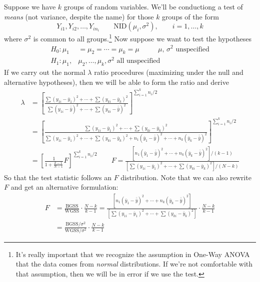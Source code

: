 \documentclass[a4paper,12pt]{scrartcl}
\begin{document}
Suppose we have $k$ groups of random variables. We'll be
conductiong a test of
\emph{means} (not variance, despite the name) for those $k$ groups
of the form
\[ Y_{i1}, Y_{i2}, \ldots, Y_{in_i} \qquad \text{NID}(\mu_i, \sigma^2),
      \qquad i=1, \ldots, k \]
where $\sigma^2$ is common to all groups.\footnote{It's really important
that we recognize the assumption in One-Way ANOVA that the data comes
from \emph{normal} distributions. If we're not comfortable with that
assumption, then we will be in error if we
use the test.} Now suppose we want to test
the hypotheses
\begin{align*}
   H_0: \mu_1& = \mu_2 = \cdots = \mu_k = \mu \qquad
      \text{ $\mu$, $\sigma^2$ unspecified} \\
   H_1: \mu_1,& \mu_2, \ldots, \mu_k, \sigma^2 \text{ all unspecified}
\end{align*}
If we carry out the normal $\lambda$ ratio procedures (maximizing
under the null and alternative hypotheses), then we will be able to
form the ratio and derive
\begin{align*}
   \lambda &= \left[ \frac{ \sum (y_{1i} - \bar{y}_1)^2 + \cdots +
      \sum (y_{ki} - \bar{y}_k)^2}{
      \sum (y_{1i} - \bar{\bar{y}})^2 + \cdots +
      \sum (y_{ki} - \bar{\bar{y}})^2}\right]^{\sum_{i=1}^k n_i/2}\\
   &= \left[ \frac{ \sum (y_{1i} - \bar{y}_1)^2 + \cdots +
      \sum (y_{ki} - \bar{y}_k)^2}{
      \sum (y_{1i} - \bar{y}_1)^2 + \cdots +
      \sum (y_{ki} - \bar{y}_k)^2
      + n_1(\bar{y}_1 - \bar{\bar{y}})^2 + \cdots
      + n_k(\bar{y}_k - \bar{\bar{y}})^2
      }\right]^{\sum_{i=1}^k n_i/2}\\
   &= \left[ \frac{1}{1+ \frac{k-1}{N-1}} F\right]^{\sum_{i=1}^k n_i/2}
   \qquad F = \frac{ [n_1(\bar{y}_1 - \bar{\bar{y}})^2 + \cdots
      + n_k(\bar{y}_k - \bar{\bar{y}})^2]/(k-1)}{
      \left[\sum (y_{1i} - \bar{y}_1)^2 + \cdots +
      \sum (y_{ki} - \bar{y}_k)^2\right]/(N-k)}
\end{align*}
So that the test statistic follows an $F$ distribution. Note that
we can also rewrite $F$ and get an alternative formulation:
\begin{align}
    F &= \frac{\text{BGSS}}{\text{WGSS}} \cdot
      \frac{N-k}{k-1} =
      \frac{ [n_1(\bar{y}_1 - \bar{\bar{y}})^2 + \cdots
      + n_k(\bar{y}_k - \bar{\bar{y}})^2]}{
      \left[\sum (y_{1i} - \bar{y}_1)^2 + \cdots +
      \sum (y_{ki} - \bar{y}_k)^2\right]} \cdot
      \frac{N-k}{k-1} \label{decomp}\\
   &= \frac{ \text{BGSS}/\sigma^2}{
      \text{WGSS}/\sigma^2} \cdot
      \frac{N-k}{k-1} \label{anovachi}
   \end{align}
\end{document}
